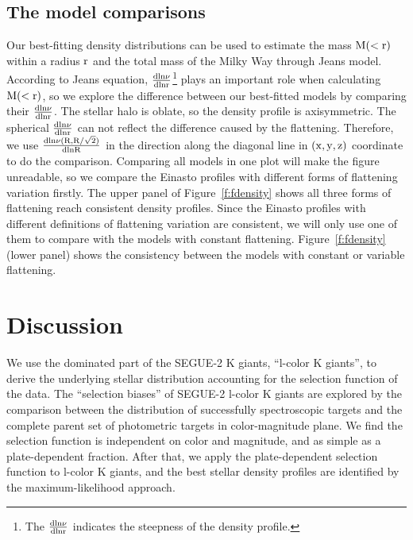 \documentclass[12pt,preprint]{aastex}
\begin{document}
\subsection{The model comparisons}
Our best-fitting density distributions can be used to estimate the mass $\rm M(<r)$ within a radius $\rm r$ and the total mass of the Milky Way through Jeans model. According to Jeans equation, $\rm \frac{dln\nu}{dlnr}$\footnote{The $\rm \frac{dln\nu}{dlnr}$ indicates the steepness of the density profile.} plays an important role when calculating $\rm M(<r)$, so we explore the difference between our best-fitted models by comparing their $\rm \frac{dln\nu}{dlnr}$. The stellar halo is oblate, so the density profile is axisymmetric. The spherical $\rm \frac{dln\nu}{dlnr}$ can not reflect the difference caused by the flattening. Therefore, we use $\rm \frac{dln\nu(R,R/\sqrt{2})}{dlnR}$ in the direction along the diagonal line in $\rm (x,y,z)$ coordinate to do the comparison. Comparing all models in one plot will make the figure unreadable, so we compare the Einasto profiles with different forms of flattening variation firstly. The upper panel of Figure~\ref{f:fdensity} shows all three forms of flattening reach consistent density profiles. Since the Einasto profiles with different definitions of flattening variation are consistent, we will only use one of them to compare with the models with constant flattening. Figure~\ref{f:fdensity} (lower panel) shows the consistency between the models with constant or variable flattening.      

\section{Discussion}
We use the dominated part of the SEGUE-2 K giants, ``l-color K giants'', to derive the underlying stellar distribution accounting for the selection function of the data. The ``selection biases'' of SEGUE-2 l-color K giants are explored by the comparison between the distribution of successfully spectroscopic targets and the complete parent set of photometric targets in color-magnitude plane. We find the selection function is independent on color and magnitude, and as simple as a plate-dependent fraction. After that, we apply the plate-dependent selection function to l-color K giants, and the best stellar density profiles are identified by the maximum-likelihood approach.
\end{document}
